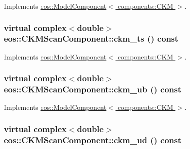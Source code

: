 Implements \hyperlink{classeos_1_1ModelComponent_3_01components_1_1CKM_01_4_a4bcd2be1cd84c0b6ea86ded723477094}{eos::ModelComponent$<$ components::CKM $>$}.\hypertarget{classeos_1_1CKMScanComponent_ab2927bf32ec2c0b8ec13aca97b932129}{
\subsubsection[{ckm\_\-ts}]{\setlength{\rightskip}{0pt plus 5cm}virtual complex$<$double$>$ eos::CKMScanComponent::ckm\_\-ts () const}}
\label{classeos_1_1CKMScanComponent_ab2927bf32ec2c0b8ec13aca97b932129}


Implements \hyperlink{classeos_1_1ModelComponent_3_01components_1_1CKM_01_4_a94edc4a96770b9a16e078c483670ecc3}{eos::ModelComponent$<$ components::CKM $>$}.\hypertarget{classeos_1_1CKMScanComponent_ace753216c0814e933038548ed237d74b}{
\subsubsection[{ckm\_\-ub}]{\setlength{\rightskip}{0pt plus 5cm}virtual complex$<$double$>$ eos::CKMScanComponent::ckm\_\-ub () const}}
\label{classeos_1_1CKMScanComponent_ace753216c0814e933038548ed237d74b}


Implements \hyperlink{classeos_1_1ModelComponent_3_01components_1_1CKM_01_4_a71547bad7b092be1631067f270056acd}{eos::ModelComponent$<$ components::CKM $>$}.\hypertarget{classeos_1_1CKMScanComponent_a18ccfd1e6541233a32870e8d20ba4a1e}{
\subsubsection[{ckm\_\-ud}]{\setlength{\rightskip}{0pt plus 5cm}virtual complex$<$double$>$ eos::CKMScanComponent::ckm\_\-ud () const}}
\label{classeos_1_1CKMScanComponent_a18ccfd1e6541233a32870e8d20ba4a1e}


